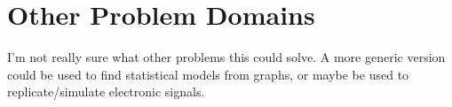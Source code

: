 \section{Other Problem Domains}

I'm not really sure what other problems this could solve. A more generic version could be used 
to find statistical models from graphs, or maybe be used to replicate/simulate electronic signals. \\
